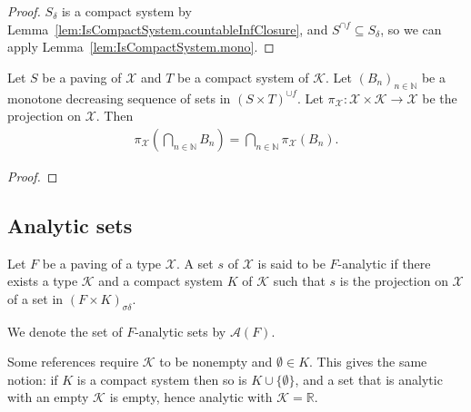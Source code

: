 \begin{proof}\mathlibok
$S_\delta$ is a compact system by Lemma~\ref{lem:IsCompactSystem.countableInfClosure}, and $S^{\cap f} \subseteq S_\delta$, so we can apply Lemma~\ref{lem:IsCompactSystem.mono}.
\end{proof}


\begin{theorem}\label{thm:fst_iInter_of_supClosure_image2_prod_of_antitone}
  \leanok
Let $S$ be a paving of $\mathcal{X}$ and $T$ be a compact system of $\mathcal{K}$.
Let $(B_n)_{n \in \mathbb{N}}$ be a monotone decreasing sequence of sets in $(S \times T)^{\cup f}$.
Let $\pi_{\mathcal{X}} : \mathcal{X} \times \mathcal{K} \to \mathcal{X}$ be the projection on $\mathcal{X}$.
Then
\begin{align*}
  \pi_{\mathcal{X}}\left(\bigcap_{n\in\mathbb{N}} B_n\right) = \bigcap_{n\in\mathbb{N}} \pi_{\mathcal{X}}(B_n).
\end{align*}
\end{theorem}

\begin{proof}\leanok

\end{proof}




\subsection{Analytic sets}

\begin{definition}\label{def:IsPavingAnalytic}
  \leanok
Let $F$ be a paving of a type $\mathcal{X}$.
A set $s$ of $\mathcal{X}$ is said to be $F$-analytic if there exists a type $\mathcal{K}$ and a compact system $K$ of $\mathcal{K}$ such that $s$ is the projection on $\mathcal{X}$ of a set in $(F \times K)_{\sigma \delta}$.

We denote the set of $F$-analytic sets by $\mathcal{A}(F)$.
\end{definition}

Some references require $\mathcal{K}$ to be nonempty and $\emptyset \in K$. This gives the same notion: if $K$ is a compact system then so is $K \cup \{\emptyset\}$, and a set that is analytic with an empty $\mathcal{K}$ is empty, hence analytic with $\mathcal{K} = \mathbb{R}$.

